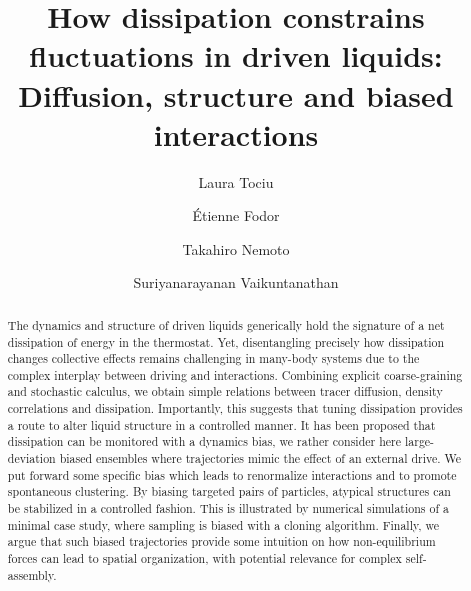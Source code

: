\documentclass[pre, superscriptaddress, twocolumn,pre]{revtex4-1}
\begin{document}
\title{How dissipation constrains fluctuations in driven liquids:\\Diffusion, structure and biased interactions}
\author{Laura Tociu}

\author{\'Etienne Fodor}

\author{Takahiro Nemoto}

\author{Suriyanarayanan Vaikuntanathan}

\begin{abstract}

The dynamics and structure of driven liquids generically hold the signature of a net dissipation of energy in the thermostat. Yet, disentangling precisely how dissipation changes collective effects remains challenging in many-body systems due to the complex interplay between driving and interactions. Combining explicit coarse-graining and stochastic calculus, we obtain simple relations between tracer diffusion, density correlations and dissipation. Importantly, this suggests that tuning dissipation provides a route to alter liquid structure in a controlled manner. It has been proposed that dissipation can be monitored with a dynamics bias, we rather consider here large-deviation biased ensembles where trajectories mimic the effect of an external drive. We put forward some specific bias which leads to renormalize interactions and to promote spontaneous clustering. By biasing targeted pairs of particles, atypical structures can be stabilized in a controlled fashion. This is illustrated by numerical simulations of a minimal case study, where sampling is biased with a cloning algorithm. Finally, we argue that such biased trajectories provide some intuition on how non-equilibrium forces can lead to spatial organization, with potential relevance for complex self-assembly.

\end{abstract}

\maketitle 
\end{document}
